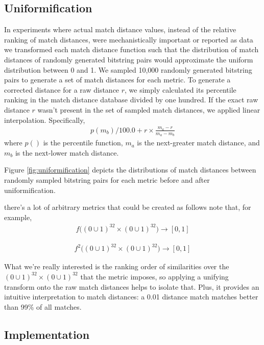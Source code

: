 \subsection{Uniformification}

In experiments where actual match distance values, instead of the relative ranking of match distances, were mechanistically important or reported as data we transformed each match distance function such that the distribution of match distances of randomly generated bitstring pairs would approximate the uniform distribution between 0 and 1.
We sampled 10,000 randomly generated bitstring pairs to generate a set of match distances for each metric.
To generate a corrected distance for a raw distance $r$, we simply calculated its percentile ranking in the match distance database divided by one hundred.
If the exact raw distance $r$ wasn't present in the set of sampled match distances, we applied linear interpolation.
Specifically,
\begin{align*}
 p(m_b)/100.0 + r \times \frac{m_a - r}{m_a - m_b}
\end{align*}
where $p()$ is the percentile function, $m_a$ is the next-greater match distance, and $m_b$ is the next-lower match distance.


Figure \ref{fig:uniformification} depicts the distributions of match distances between randomly sampled bitstring pairs for each metric before and after uniformification.

there's a lot of arbitrary metrics that could be created as follows
note that, for example,
\begin{align*}
f\Big( (0 \cup 1)^{32} \times (0 \cup 1)^{32} \Big) \rightarrow [0, 1]
\end{align*}

\begin{align*}
f^2\Big( (0 \cup 1)^{32} \times (0 \cup 1)^{32} \Big) \rightarrow [0, 1]
\end{align*}

What we're really interested is the ranking order of similarities over the $(0 \cup 1)^{32} \times (0 \cup 1)^{32}$ that the metric imposes, so applying a unifying transform onto the raw match distances helps to isolate that.
Plus, it provides an intuitive interpretation to match distances: a 0.01 distance match matches better than 99\% of all matches.

\subsection{Implementation}


